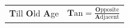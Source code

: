 {\begin{tabular}[t]{|l|l|}
        \textbf{T}ill \textbf{O}ld \textbf{A}ge &
    
    
        
                  \begin{math}\mathbf{T}\mathrm{an}=\frac{\mathbf{O}\mathrm{pposite}}{\mathbf{A}\mathrm{djacent}}\end{math}
     \tabularnewline\cline{1-1}\cline{2-2}
    \end{tabular}} %
